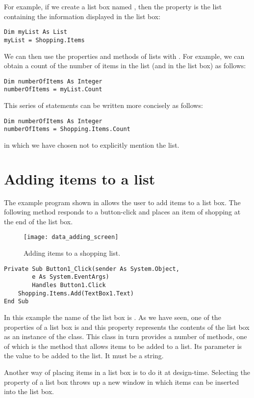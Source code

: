 		For example, if we create a list box named , then the property  is the list containing the information displayed in the list box:
		\begin{lstlisting}
Dim myList As List
myList = Shopping.Items
		\end{lstlisting}
		We can then use the properties and methods of lists with . For example, we can obtain a count of the number of items in the list (and in the list box) as follows:
		\begin{lstlisting}
Dim numberOfItems As Integer
numberOfItems = myList.Count
		\end{lstlisting}
		This series of statements can be written more concisely as follows:
		\begin{lstlisting}
Dim numberOfItems As Integer
numberOfItems = Shopping.Items.Count
		\end{lstlisting}
		in which we have chosen not to explicitly mention the list.


	\section{Adding items to a list}
		The example program shown in  allows the user to add items to a list box. The following method responds to a button-click and places an item of shopping at the end of the list box.
		\begin{figure}[bth]
			\centering
			\texttt{[image: data\_adding\_screen]}
			\caption{Adding items to a shopping list.}
			\label{fig:data_adding_screen}
		\end{figure}
		\begin{lstlisting}
Private Sub Button1_Click(sender As System.Object,
		e As System.EventArgs)
		Handles Button1.Click
	Shopping.Items.Add(TextBox1.Text)
End Sub
		\end{lstlisting}
		In this example the name of the list box is . As we have seen, one of the properties of a list box is  and this property represents the contents of the list box as an instance of the  class. This class in turn provides a number of methods, one of which is the  method that allows items to be added to a list. Its parameter is the value to be added to the list. It must be a string.
		
		Another way of placing items in a list box is to do it at design-time. Selecting the  property of a list box throws up a new window in which items can be inserted into the list box.


